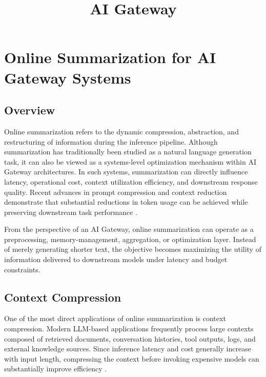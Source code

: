 \documentclass[11pt,a4paper]{article}
\title{\vspace{-1cm}\Huge\bfseries AI Gateway}
\date{}
\begin{document}
\maketitle

\section{Online Summarization for AI Gateway Systems}

\subsection{Overview}

Online summarization refers to the dynamic compression, abstraction, and restructuring of information during the inference pipeline. Although summarization has traditionally been studied as a natural language generation task, it can also be viewed as a systems-level optimization mechanism within AI Gateway architectures. In such systems, summarization can directly influence latency, operational cost, context utilization efficiency, and downstream response quality. Recent advances in prompt compression and context reduction demonstrate that substantial reductions in token usage can be achieved while preserving downstream task performance \cite{jiang2023llmlingua,jiang2024longllmlinguaacceleratingenhancingllms,verma2024contextualcompressionretrievalaugmentedgeneration}.

From the perspective of an AI Gateway, online summarization can operate as a preprocessing, memory-management, aggregation, or optimization layer. Instead of merely generating shorter text, the objective becomes maximizing the utility of information delivered to downstream models under latency and budget constraints.

\subsection{Context Compression}

One of the most direct applications of online summarization is context compression. Modern LLM-based applications frequently process large contexts composed of retrieved documents, conversation histories, tool outputs, logs, and external knowledge sources. Since inference latency and cost generally increase with input length, compressing the context before invoking expensive models can substantially improve efficiency \cite{jiang2023llmlingua,jiang2024longllmlinguaacceleratingenhancingllms}.
\end{document}
